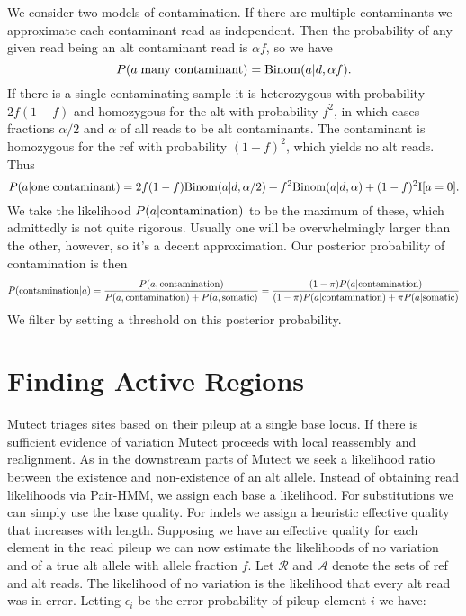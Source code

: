 \documentclass[nofootinbib,amssymb,amsmath]{revtex4}
\begin{document}
We consider two models of contamination.  If there are multiple contaminants we approximate each contaminant read as independent.  Then the probability of any given read being an alt contaminant read is $\alpha f$, so we have
\begin{equation}
P(a | {\rm many~contaminant}) = {\rm Binom}(a | d, \alpha f).
\end{equation}
If there is a single contaminating sample it is heterozygous with probability $2f(1-f)$ and homozygous for the alt with probability $f^2$, in which cases fractions $\alpha/2$ and $\alpha$ of all reads to be alt contaminants.  The contaminant is homozygous for the ref with probability $(1-f)^2$, which yields no alt reads. Thus
\begin{equation}
P(a | {\rm one~contaminant}) = 2f(1-f) {\rm Binom}(a | d, \alpha /2) + f^2 {\rm Binom}(a | d, \alpha) + (1-f)^2 {\rm I}[a = 0].
\end{equation}
We take the likelihood $P(a | {\rm contamination})$ to be the maximum of these, which admittedly is not quite rigorous.  Usually one will be overwhelmingly larger than the other, however, so it's a decent approximation.  Our posterior probability of contamination is then
\begin{equation}
P({\rm contamination} | a) = \frac{  P(a, {\rm contamination}) } {P(a, {\rm contamination}) + P(a, {\rm somatic}) } = \frac{  (1-\pi)P(a | {\rm contamination}) } {(1-\pi)P(a | {\rm contamination}) + \pi P(a | {\rm somatic}) }
\end{equation}
We filter by setting a threshold on this posterior probability.

\section{Finding Active Regions}
Mutect triages sites based on their pileup at a single base locus.  If there is sufficient evidence of variation Mutect proceeds with local reassembly and realignment.  As in the downstream parts of Mutect we seek a likelihood ratio between the existence and non-existence of an alt allele.  Instead of obtaining read likelihoods via Pair-HMM, we assign each base a likelihood.  For substitutions we can simply use the base quality.  For indels we assign a heuristic effective quality that increases with length.  Supposing we have an effective quality for each element in the read pileup we can now estimate the likelihoods of no variation and of a true alt allele with allele fraction $f$.  Let $\mathcal{R}$ and $\mathcal{A}$ denote the sets of ref and alt reads.  The likelihood of no variation is the likelihood that every alt read was in error.  Letting $\epsilon_i$ be the error probability of pileup element $i$ we have:
\end{document}
